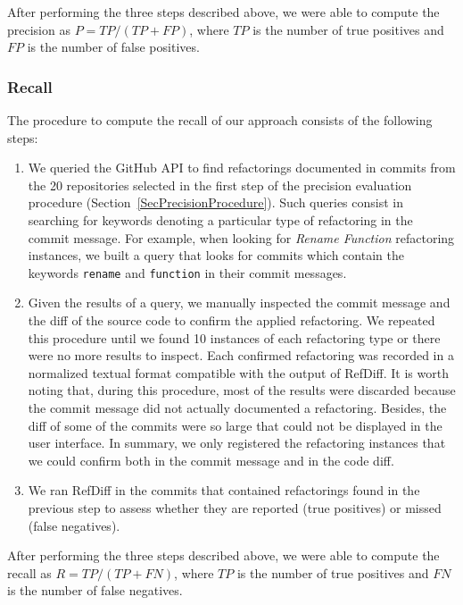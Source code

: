 After performing the three steps described above, we were able to compute the precision as $P = \mathit{TP} / (\mathit{TP} + \mathit{FP})$, where $\mathit{TP}$ is the number of true positives and $\mathit{FP}$ is the number of false positives.



\subsubsection{Recall}

The procedure to compute the recall of our approach consists of the following steps:

\begin{enumerate}  
\item We queried the GitHub API to find refactorings documented in commits from the 20 repositories selected in the first step of the precision evaluation procedure (Section~\ref{SecPrecisionProcedure}). Such queries consist in searching for keywords denoting a particular type of refactoring in the commit message. For example, when looking for \emph{Rename Function} refactoring instances, we built a query that looks for commits which contain the keywords \texttt{rename} and \texttt{function} in their commit messages.

\item Given the results of a query, we manually inspected the commit message and the diff of the source code to confirm the applied refactoring. We repeated this procedure until we found 10 instances of each refactoring type or there were no more results to inspect. Each confirmed refactoring was recorded in a normalized textual format compatible with the output of RefDiff. It is worth noting that, during this procedure, most of the results were discarded because the commit message did not actually documented a refactoring. Besides, the diff of some of the commits were so large that could not be displayed in the user interface. In summary, we only registered the refactoring instances that we could confirm both in the commit message and in the code diff.

\item We ran RefDiff in the commits that contained refactorings found in the previous step to assess whether they are reported (true positives) or missed (false negatives). 

\end{enumerate}

After performing the three steps described above, we were able to compute the recall as $R = \mathit{TP} / (\mathit{TP} + \mathit{FN})$, where $\mathit{TP}$ is the number of true positives and $\mathit{FN}$ is the number of false negatives.



